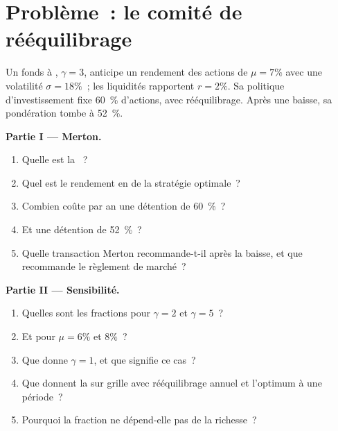 \section{Problème~: le comité de rééquilibrage}

\begin{problem}\label{pb:qm:stochastic-control:1}
Un fonds à , $\gamma = 3$, anticipe un rendement des actions de $\mu = 7\%$ avec une volatilité $\sigma = 18\%$~; les liquidités rapportent $r =
2\%$. Sa politique d'investissement fixe 60~\% d'actions, avec rééquilibrage. Après une baisse, sa pondération tombe à 52~\%.

\medskip\noindent\textbf{Partie I --- Merton.}
\begin{enumerate}
\item Quelle est la ~?
\item Quel est le rendement en  de la stratégie optimale~?
\item Combien coûte par an une détention de 60~\%~?
\item Et une détention de 52~\%~?
\item Quelle transaction Merton recommande-t-il après la baisse, et que recommande le règlement de marché~?
\end{enumerate}

\medskip\noindent\textbf{Partie II --- Sensibilité.}
\begin{enumerate}[resume]
\item Quelles sont les fractions pour $\gamma = 2$ et $\gamma = 5$~?
\item Et pour $\mu = 6\%$ et $8\%$~?
\item Que donne $\gamma = 1$, et que signifie ce cas~?
\item Que donnent la  sur grille avec rééquilibrage annuel et l'optimum à une période~?
\item Pourquoi la fraction ne dépend-elle pas de la richesse~?
\end{enumerate}


\end{problem}
